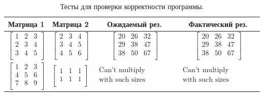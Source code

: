 \documentclass[12pt]{report}
\begin{document}
\begin{table}[h]
	\caption{\label{tab:tests}Тесты для проверки корректности программы.}
	\begin{center}
		\begin{tabular}{ | c | c | c | c |}
			\hline
			\textbf{Матрица 1} & \textbf{Матрица 2} & \textbf{Ожидаемый рез.} & \textbf{Фактический рез.}\\ \hline
			$\begin{bmatrix} 
				1&2&3 \\
				2&3&4 \\ 
				3&4&5 \\ 
			\end{bmatrix}$ & 
			$\begin{bmatrix} 
				2&3&4 \\
				3&4&5 \\ 
				4&5&6 \\ 
			\end{bmatrix}$ &
			$\begin{bmatrix} 
				20&26&32 \\
				29&38&47 \\ 
				38&50&67 \\ 
			\end{bmatrix}$ &
			$\begin{bmatrix} 
				20&26&32 \\
				29&38&47 \\ 
				38&50&67 \\ 
			\end{bmatrix} $\\
			\hline
			
			$\begin{bmatrix} 
				1&2&3 \\
				4&5&6 \\ 
				7&8&9 \\ 
			\end{bmatrix}$ & 
			$\begin{bmatrix} 
				1&1&1 \\
				1&1&1 \\ 
			\end{bmatrix}$ &
			$\begin{matrix} 
				\text{Can't multiply matricies} \\
				\text{with such sizes} \\ 
			\end{matrix}$ &
			$\begin{matrix} 
				\text{Can't multiply matricies} \\
				\text{with such sizes} \\ 
			\end{matrix}$\\
			\hline
			

\end{tabular}
\end{center}
\end{table}
\end{document}
